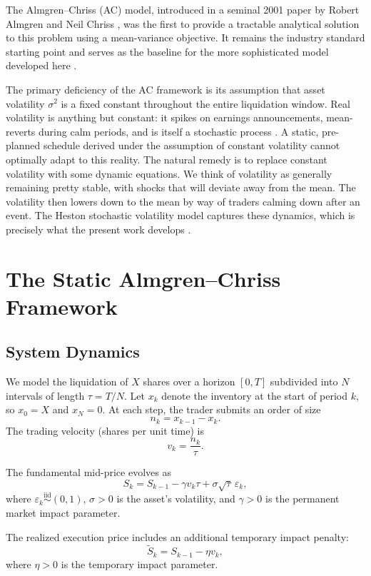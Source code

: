 \documentclass[11pt]{article}
\begin{document}
The Almgren--Chriss (AC) model, introduced in a seminal 2001 paper by Robert Almgren and Neil Chriss , was the first to provide a tractable analytical solution to this problem using a mean-variance objective. It remains the industry standard starting point and serves as the baseline for the more sophisticated model developed here \cite{almgren2001optimal}.

The primary deficiency of the AC framework is its assumption that asset volatility $\sigma^2$ is a fixed constant throughout the entire liquidation window. Real volatility is anything but constant: it spikes on earnings announcements, mean-reverts during calm periods, and is itself a stochastic process \cite{engle1982arch}. A static, pre-planned schedule derived under the assumption of constant volatility cannot optimally adapt to this reality. The natural remedy is to replace constant volatility with some dynamic equations. We think of volatility as generally remaining pretty stable, with shocks that will deviate away from the mean. The volatility then lowers down to the mean by way of traders calming down after an event. The Heston stochastic volatility model captures these dynamics, which is precisely what the present work develops \cite{heston1993closed}.

\section{The Static Almgren--Chriss Framework} 

\subsection{System Dynamics}

We model the liquidation of $X$ shares over a horizon $[0, T]$ subdivided into $N$ intervals of length $\tau = T/N$. Let $x_k$ denote the inventory at the start of period $k$, so $x_0 = X$ and $x_N = 0$. At each step, the trader submits an order of size
\[
n_k = x_{k-1} - x_k.
\]
The trading velocity (shares per unit time) is
\[
v_k = \frac{n_k}{\tau}.
\]

The fundamental mid-price evolves as
\[
S_k = S_{k-1} - \gamma v_k \tau + \sigma\sqrt{\tau}\,\varepsilon_k,
\]
where $\varepsilon_k \overset{\text{iid}}{\sim} (0,1)$, $\sigma > 0$ is the asset's volatility, and $\gamma > 0$ is the permanent market impact parameter.

The realized execution price includes an additional temporary impact penalty:
\[
\tilde{S}_k = S_{k-1} - \eta v_k,
\]
where $\eta > 0$ is the temporary impact parameter.
\end{document}
